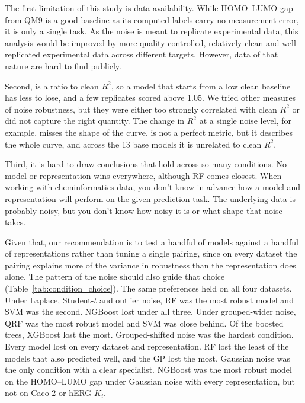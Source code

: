The first limitation of this study is data availability. While HOMO--LUMO gap from QM9 is a good baseline as its computed labels carry no measurement error, it is only a single task. As the noise is meant to replicate experimental data, this analysis would be improved by more quality-controlled, relatively clean and well-replicated experimental data across different targets. However, data of that nature are hard to find publicly.

Second, \aucnorm{} is a ratio to clean $R^2$, so a model that starts from a low clean baseline has less to lose, and a few replicates scored above 1.05. We tried other measures of noise robustness, but they were either too strongly correlated with clean $R^2$ or did not capture the right quantity. The change in $R^2$ at a single noise level, for example, misses the shape of the curve. \aucnorm{} is not a perfect metric, but it describes the whole curve, and across the 13 base models it is unrelated to clean $R^2$.

Third, it is hard to draw conclusions that hold across so many conditions. No model or representation wins everywhere, although RF comes closest. When working with cheminformatics data, you don't know in advance how a model and representation will perform on the given prediction task. The underlying data is probably noisy, but you don't know how noisy it is or what shape that noise takes.

Given that, our recommendation is to test a handful of models against a handful of representations rather than tuning a single pairing, since on every dataset the pairing explains more of the variance in robustness than the representation does alone. The pattern of the noise should also guide that choice (Table~\ref{tab:condition_choice}). The same preferences held on all four datasets. Under Laplace, Student-$t$ and outlier noise, RF was the most robust model and SVM was the second. NGBoost lost \aucnorm{} under all three. Under grouped-wider noise, QRF was the most robust model and SVM was close behind. Of the boosted trees, XGBoost lost the most. Grouped-shifted noise was the hardest condition. Every model lost \aucnorm{} on every dataset and representation. RF lost the least of the models that also predicted well, and the GP lost the most. Gaussian noise was the only condition with a clear specialist. NGBoost was the most robust model on the HOMO--LUMO gap under Gaussian noise with every representation, but not on Caco-2 or hERG $K_i$.

